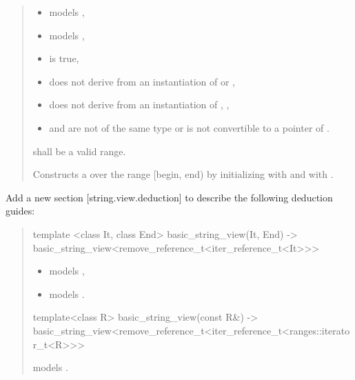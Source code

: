 \documentclass{wg21}
\begin{document}
\begin{quote}
\begin{addedblock}
\begin{itemdescr}
    \constraints
    \begin{itemize}
        \item {} models ,
        \item {} models ,
        \item {} is true,
        \item {} does not derive from an instantiation of   or  ,
        \item {} does not derive from an instantiation of  ,
        ,
        \item {} and  are not of the same type or  is not convertible to a pointer of .
    \end{itemize}

    \expects
     shall be a valid range.

    \effects
    Constructs a  over the range [begin, end) by initializing  with  and  with .

\end{itemdescr}
\end{addedblock}
\end{quote}


Add a new section [string.view.deduction] to describe the following deduction guides:



\begin{quote}
\begin{addedblock}
\begin{itemdecl}
template <class It, class End>
basic_string_view(It, End) -> basic_string_view<remove_reference_t<iter_reference_t<It>>>
\end{itemdecl}
\begin{itemdescr}
    \constraints
    \begin{itemize}
        \item {} models ,
        \item {} models .
    \end{itemize}
\end{itemdescr}

\begin{itemdecl}
template<class R>
basic_string_view(const R&)
-> basic_string_view<remove_reference_t<iter_reference_t<ranges::iterator_t<R>>>
\end{itemdecl}
\begin{itemdescr}
    \constraints {} models .
\end{itemdescr}

\end{addedblock}
\end{quote}
\end{document}
